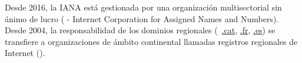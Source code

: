 \begin{remark}
Desde 2016, la IANA está gestionada por una organización multisectorial sin ánimo de lucro 
( - Internet Corporation for Assigned Names and Numbers).
% 
Desde 2004, la responsabilidad de los dominios regionales 
(\eg\ \url{.cat}, \url{.fr}, \url{.es}) se transfiere a 
organizaciones de ámbito continental llamadas registros regionales de Internet ().
\end{remark}









